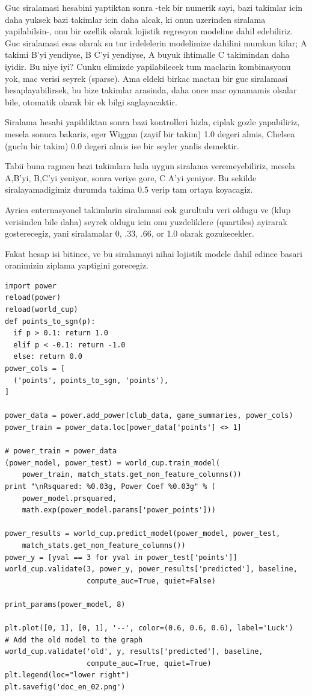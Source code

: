 \documentclass[12pt,fleqn]{article}\usepackage{../common}
\begin{document}
Guc siralamasi hesabini yaptiktan sonra -tek bir numerik sayi, bazi
takimlar icin daha yuksek bazi takimlar icin daha alcak, ki onun uzerinden
siralama yapilabilsin-, onu bir ozellik olarak lojistik regresyon modeline
dahil edebiliriz. Guc siralamasi esas olarak su tur irdelelerin modelimize
dahilini mumkun kilar; A takimi B'yi yendiyse, B C'yi yendiyse, A buyuk
ihtimalle C takimindan daha iyidir. Bu niye iyi?  Cunku elimizde
yapilabilecek tum maclarin kombinasyonu yok, mac verisi seyrek
(sparse). Ama eldeki birkac mactan bir guc siralamasi hesaplayabilirsek, bu
bize takimlar arasinda, daha once mac oynamamis olsalar bile, otomatik
olarak bir ek bilgi saglayacaktir. 

Siralama hesabi yapildiktan sonra bazi kontrolleri hizla, ciplak gozle
yapabiliriz, mesela sonuca bakariz, eger Wiggan (zayif bir takim) 1.0
degeri almis, Chelsea (guclu bir takim) 0.0 degeri almis ise bir seyler
yanlis demektir.

Tabii buna ragmen bazi takimlara hala uygun siralama veremeyebiliriz,
mesela A,B'yi, B,C'yi yeniyor, sonra veriye gore, C A'yi yeniyor. Bu
sekilde siralayamadigimiz durumda takima 0.5 verip tam ortaya koyacagiz.

Ayrica enternasyonel takimlarin siralamasi cok gurultulu veri oldugu ve
(klup verisinden bile daha) seyrek oldugu icin onu yuzdeliklere (quartiles)
ayirarak gosterecegiz, yani siralamalar 0, .33, .66, or 1.0 olarak
gozukecekler.

Fakat hesap isi bitince, ve bu siralamayi nihai lojistik modele dahil
edince basari oranimizin ziplama yaptigini gorecegiz.

\begin{verbatim}
import power
reload(power)
reload(world_cup)
def points_to_sgn(p):
  if p > 0.1: return 1.0
  elif p < -0.1: return -1.0
  else: return 0.0
power_cols = [
  ('points', points_to_sgn, 'points'),
]

power_data = power.add_power(club_data, game_summaries, power_cols)
power_train = power_data.loc[power_data['points'] <> 1] 

# power_train = power_data
(power_model, power_test) = world_cup.train_model(
    power_train, match_stats.get_non_feature_columns())
print "\nRsquared: %0.03g, Power Coef %0.03g" % (
    power_model.prsquared, 
    math.exp(power_model.params['power_points']))

power_results = world_cup.predict_model(power_model, power_test, 
    match_stats.get_non_feature_columns())
power_y = [yval == 3 for yval in power_test['points']]
world_cup.validate(3, power_y, power_results['predicted'], baseline, 
                   compute_auc=True, quiet=False)

print_params(power_model, 8)

plt.plot([0, 1], [0, 1], '--', color=(0.6, 0.6, 0.6), label='Luck')
# Add the old model to the graph
world_cup.validate('old', y, results['predicted'], baseline, 
                   compute_auc=True, quiet=True)
plt.legend(loc="lower right")
plt.savefig('doc_en_02.png')
\end{verbatim}
\end{document}
